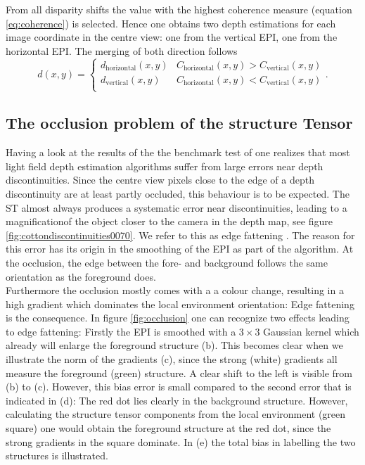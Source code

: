 \documentclass  [
  paper    = a4,
  BCOR     = 10mm,
  twoside,
  fontsize = 12pt,
  fleqn,
  toc      = bibnumbered,
  toc      = listofnumbered,
  numbers  = noendperiod,
  headings = normal,
  listof   = leveldown,
  version  = 3.03
]                                       {scrreprt}
\begin{document}
 From all disparity shifts the value with the highest coherence measure (equation \ref{eq:coherence}) is selected. Hence one obtains two depth estimations for each image coordinate in the centre view: one from the vertical EPI, one from the horizontal EPI. The merging of both direction follows
 \begin{equation}\label{key}
 d(x,y) = \begin{cases} d_\text{horizontal}(x,y) & C_\text{horizontal}(x,y)>C_\text{vertical}(x,y)\\
 						d_\text{vertical}(x,y) & C_\text{horizontal}(x,y)<C_\text{vertical}(x,y)\\
 		\end{cases}.
 \end{equation} 
 \subsection{The occlusion problem of the structure Tensor}
 \label{sec:occlusionproblem}
 Having a look at the results of the the benchmark test of \cite{honauer2016benchmark} one realizes that most light field depth estimation algorithms suffer from large errors near depth discontinuities. Since the centre view pixels close to the edge of a depth discontinuity are at least partly occluded, this behaviour is to be expected. The ST almost always produces a systematic error near discontinuities, leading to a \glqq magnification\grqq of the object closer to the camera in the depth map, see figure \ref{fig:cottondiscontinuities0070}. We refer to this as \glqq edge fattening \grqq. The reason for this error has its origin in the smoothing of the EPI as part of the algorithm.  At the occlusion, the edge between the fore- and background follows the same orientation as the foreground does. \\
  Furthermore the occlusion mostly comes with a a colour change, resulting in a high gradient which dominates the local environment orientation: Edge fattening is the consequence. In figure \ref{fig:occlusion} one can recognize two effects leading to edge fattening: Firstly the EPI is smoothed with a $3\times 3$ Gaussian kernel which already will enlarge the foreground structure (b). This becomes clear when we illustrate the norm of the gradients (c), since the strong (white) gradients all measure the foreground (green) structure. A clear shift to the left is visible from (b) to (c). However, this bias error is small compared to the second error that is indicated in (d): The red dot lies clearly in the background structure. However, calculating the structure tensor components from the local environment (green square) one would obtain the foreground structure at the red dot, since the strong gradients in the square dominate. In (e) the total bias in labelling the two structures is illustrated. 
\end{document}
